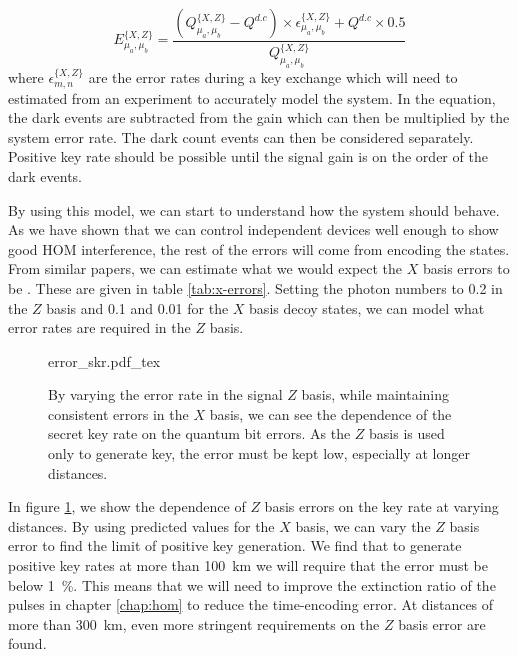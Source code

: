 \begin{equation}
	E^{\{X,Z\}}_{\mu_a,\mu_b} = \frac{\left(Q^{\{X,Z\}}_{\mu_a,\mu_b} - Q^{d.c}\right) \times \epsilon^{\{X,Z\}}_{\mu_a,\mu_b} + Q^{d.c} \times 0.5}{Q^{\{X,Z\}}_{\mu_a,\mu_b}}
\end{equation}
where $\epsilon^{\{X,Z\}}_{m,n}$ are the error rates during a key exchange which will need to estimated from an experiment to accurately model the system. In the equation, the dark events are subtracted from the gain which can then be multiplied by the system error rate. The dark count events can then be considered separately. Positive key rate should be possible until the signal gain is on the order of the dark events.

By using this model, we can start to understand how the system should behave. As we have shown that we can control independent devices well enough to show good \ac{HOM} interference, the rest of the errors will come from encoding the states. From similar papers, we can estimate what we would expect the $X$ basis errors to be \cite{Rubenok2013, Comandar2016}. These are given in table \ref{tab:x-errors}. Setting the photon numbers to \num{0.2} in the $Z$ basis and \num{0.1} and \num{0.01} for the $X$ basis decoy states, we can model what error rates are required in the $Z$ basis.

\begin{figure}[tp]
	\centering
	\small
	\def\svgwidth{0.9\textwidth} 
	{error_skr.pdf_tex}
	\caption[Error dependence of secret key rate]{By varying the error rate in the signal $Z$ basis, while maintaining consistent errors in the $X$ basis, we can see the dependence of the secret key rate on the quantum bit errors. As the $Z$ basis is used only to generate key, the error must be kept low, especially at longer distances.}
	\label{fig:skr_error_dependence}
\end{figure}

In figure \ref{fig:skr_error_dependence}, we show the dependence of $Z$ basis errors on the key rate at varying distances. By using predicted values for the $X$ basis, we can vary the $Z$ basis error to find the limit of positive key generation. We find that to generate positive key rates at more than \SI{100}{\km} we will require that the error must be below \SI{1}{\percent}. This means that we will need to improve the extinction ratio of the pulses in chapter \ref{chap:hom} to reduce the time-encoding error. At distances of more than \SI{300}{\km}, even more stringent requirements on the $Z$ basis error are found.

